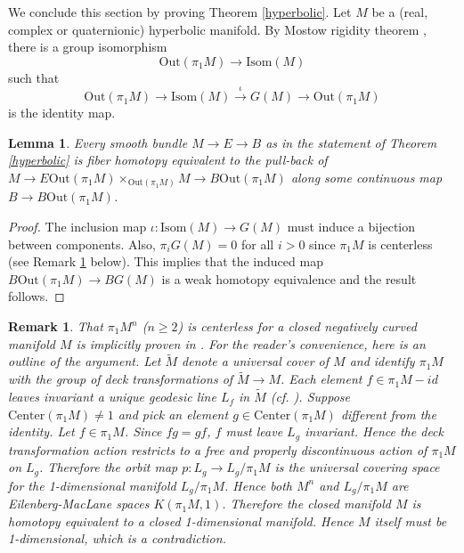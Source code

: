 \documentclass[onecolumn,notitlepage,11pt]{article}
\newcommand{\beq}{\begin{equation*}}
\newcommand{\eeq}{\end{equation*}}
\newtheorem{lemma}{Lemma}[section]
\newtheorem{rmk}{Remark}
\theoremstyle{definition}
\begin{document}
We conclude this section by proving
Theorem \ref{hyperbolic}. Let $M$ be a (real, complex or
quaternionic)
hyperbolic manifold. By Mostow rigidity 
theorem \cite{mostow}, there is a group isomorphism
\beq
\mbox{Out}(\pi_1M)\to\mbox{Isom}(M)
\eeq
such that
\beq
\mbox{Out}(\pi_1M)\to\mbox{Isom}(M)
\xrightarrow{\iota}G(M)\to\mbox{Out}(\pi_1M)
\eeq
is the identity map.
\begin{lemma}\label{homotopytype}
Every smooth bundle $M\to E\to B$ as in the statement of 
Theorem \ref{hyperbolic} is fiber homotopy equivalent to the pull-back
of 
$M\to E\mbox{Out}(\pi_1M)\times_{\mbox{Out}(\pi_1M)}M\to B\mbox{Out}(\pi_1M)$ along some continuous map 
$B\to B\mbox{Out}(\pi_1M)$.
\end{lemma}
\begin{proof}
The inclusion map 
$\iota:\mbox{Isom}(M)\to G(M)$ must induce a bijection between components.
Also, $\pi_iG(M)=0$ for all $i>0$ since $\pi_1M$ is centerless
(see Remark \ref{centerless} below). This
implies that the induced map
$B\mbox{Out}(\pi_1M)\to BG(M)$ is a weak homotopy equivalence and the
result follows.
\end{proof}
\begin{rmk}\label{centerless}
That $\pi_1M^n$ ($n\geq 2$) is centerless for a closed negatively
curved manifold $M$ is implicitly proven in 
\cite[Section 9]{EO}. For the reader's convenience, here is an
outline of the argument. Let $\widetilde{M}$ denote a universal
cover of $M$ and identify $\pi_1M$ with the group of deck
transformations of $\widetilde{M}\to M$. Each element 
$f\in\pi_1M-id$ leaves invariant a unique geodesic line $L_f$
in $\widetilde{M}$ (cf. \cite[7.1]{BGS}).
Suppose $\mbox{Center}(\pi_1M)\neq 1$ and pick an element 
$g\in \mbox{Center}(\pi_1M)$ different from the identity. Let
$f\in\pi_1M$. Since $fg=gf$, $f$ must leave $L_g$ invariant. 
Hence the deck transformation action restricts to a free and 
properly discontinuous action of $\pi_1M$ on $L_g$. Therefore
the orbit map $p:L_g\to L_g/\pi_1M$ is the universal covering
space for the 1-dimensional manifold $L_g/\pi_1M$. Hence both
$M^n$ and $L_g/\pi_1M$ are Eilenberg-MacLane spaces 
$K(\pi_1M,1)$. Therefore the closed manifold $M$ is homotopy equivalent to a closed 1-dimensional manifold. 
Hence $M$ itself must
be 1-dimensional, which is a 
contradiction.
\end{rmk}
\end{document}
